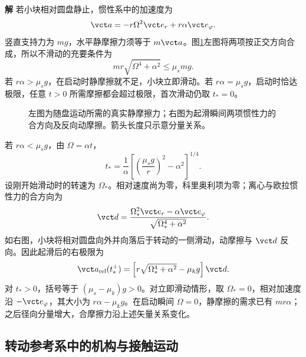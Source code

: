 \documentclass[11pt,openany,fontset=fandol]{ctexbook}
\theoremstyle{definition}\newtheorem{example}{例}[chapter]\newtheorem{exercise}{习题}[chapter]
\newcommand{\SolutionStart}{\par\medskip\ifdim\pagetotal>0pt\ifdim\dimexpr\pagegoal-\pagetotal\relax<3\baselineskip\newpage\fi\fi\noindent\textbf{解}\quad\ignorespaces}
\newenvironment{solution}{\SolutionStart}{\par\medskip}
\begin{document}
\begin{solution}
若小块相对圆盘静止，惯性系中的加速度为
\[
\vct a=-r\Omega^2\vct e_r+r\alpha\vct e_\varphi.
\]
竖直支持力为 $mg$，水平静摩擦力须等于 $m\vct a$。图\ref{mp3:fig:l3-e12-s}左图将两项按正交方向合成，所以不滑动的充要条件为
\[
mr\sqrt{\Omega^4+\alpha^2}\le\mu_smg.
\]
若 $r\alpha>\mu_sg$，在启动时静摩擦就不足，小块立即滑动。若 $r\alpha=\mu_sg$，启动时恰达极限，任意 $t>0$ 所需摩擦都会超过极限，首次滑动仍取 $t_\ast=0$。

\begin{figure}[H]\centering
{}
\caption{左图为随盘运动所需的真实静摩擦力；右图为起滑瞬间两项惯性力的合方向及反向动摩擦。箭头长度只示意分量关系。}\label{mp3:fig:l3-e12-s}
\end{figure}


若 $r\alpha<\mu_sg$，由 $\Omega=\alpha t$，
\[
t_\ast=\frac1\alpha
\left[\left(\frac{\mu_sg}{r}\right)^2-\alpha^2\right]^{1/4}.
\]
设刚开始滑动时的转速为 $\Omega_\ast$。相对速度尚为零，科里奥利项为零；离心与欧拉惯性力的合方向为
\[
\vct d=\frac{\Omega_\ast^2\vct e_r-\alpha\vct e_\varphi}
{\sqrt{\Omega_\ast^4+\alpha^2}}.
\]
如右图，小块将相对圆盘向外并向落后于转动的一侧滑动，动摩擦与 $\vct d$ 反向。因此起滑后的右极限为
\[
\vct a_{\rm rel}(t_\ast^+)
=\left[r\sqrt{\Omega_\ast^4+\alpha^2}-\mu_kg\right]\vct d.
\]
对 $t_\ast>0$，括号等于 $(\mu_s-\mu_k)g>0$。对立即滑动情形，取 $\Omega_\ast=0$，相对加速度沿 $-\vct e_\varphi$，其大小为 $r\alpha-\mu_kg$。在启动瞬间 $\Omega=0$，静摩擦的需求已有 $mr\alpha$；之后径向分量增大，合摩擦力沿上述矢量关系变化。

\end{solution}


\subsection{转动参考系中的机构与接触运动}
\end{document}
